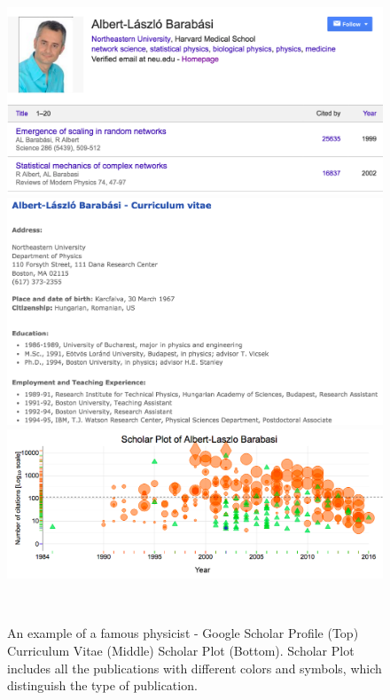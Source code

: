 \begin{figure}
  \centering
  \includegraphics[width=.8\textwidth]{figures/fig_publication-1}
  \includegraphics[width=.8\textwidth]{figures/fig_publication-2}
  \includegraphics[width=.8\textwidth]{figures/fig_publication-3}
  \caption{An example of a famous physicist - Google Scholar Profile (Top) Curriculum Vitae (Middle) Scholar Plot (Bottom). Scholar Plot includes all the publications with different colors and symbols, which distinguish the type of publication.}~\label{fig-publication}
\end{figure}


